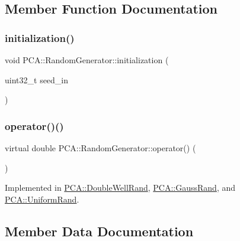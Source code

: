 \subsection{Member Function Documentation}
\hypertarget{class_p_c_a_1_1_random_generator_aa2ea4616dd82da5cf66b8232697ecba8}{}\label{class_p_c_a_1_1_random_generator_aa2ea4616dd82da5cf66b8232697ecba8} 
\subsubsection{\texorpdfstring{initialization()}{initialization()}}
{\footnotesize\ttfamily void P\+C\+A\+::\+Random\+Generator\+::initialization (\begin{DoxyParamCaption}\item[{uint32\+\_\+t}]{seed\+\_\+in }\end{DoxyParamCaption})\hspace{0.3cm}{\ttfamily [static]}}

\hypertarget{class_p_c_a_1_1_random_generator_a4361e39397900ae1e7b2cfa91a592509}{}\label{class_p_c_a_1_1_random_generator_a4361e39397900ae1e7b2cfa91a592509} 
\subsubsection{\texorpdfstring{operator()()}{operator()()}}
{\footnotesize\ttfamily virtual double P\+C\+A\+::\+Random\+Generator\+::operator() (\begin{DoxyParamCaption}{ }\end{DoxyParamCaption})\hspace{0.3cm}{\ttfamily [pure virtual]}}



Implemented in \hyperlink{class_p_c_a_1_1_double_well_rand_a13beb4ae56cd6ccb1d6e4c1e2a03ff9b}{P\+C\+A\+::\+Double\+Well\+Rand}, \hyperlink{class_p_c_a_1_1_gauss_rand_a594130952a4999972f08b429ea6af959}{P\+C\+A\+::\+Gauss\+Rand}, and \hyperlink{class_p_c_a_1_1_uniform_rand_a25b9b060f2201800a5badfa2b70d0eed}{P\+C\+A\+::\+Uniform\+Rand}.



\subsection{Member Data Documentation}
\hypertarget{class_p_c_a_1_1_random_generator_abfbe847dad295b691364d0197283afb7}{}\label{class_p_c_a_1_1_random_generator_abfbe847dad295b691364d0197283afb7} 
